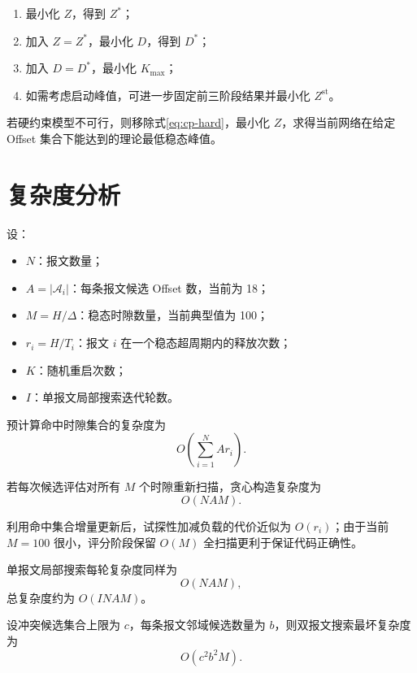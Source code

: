 \documentclass[UTF8,12pt,a4paper]{ctexart}
\newcommand{\Oset}{\mathcal{A}}
\begin{document}
\begin{enumerate}
  \item 最小化 $Z$，得到 $Z^*$；
  \item 加入 $Z=Z^*$，最小化 $D$，得到 $D^*$；
  \item 加入 $D=D^*$，最小化 $K_{\max}$；
  \item 如需考虑启动峰值，可进一步固定前三阶段结果并最小化 $Z^{\mathrm{st}}$。
\end{enumerate}

若硬约束模型不可行，则移除式\eqref{eq:cp-hard}，最小化 $Z$，求得当前网络在给定 Offset 集合下能达到的理论最低稳态峰值。

\section{复杂度分析}

设：

\begin{itemize}
  \item $N$：报文数量；
  \item $A=|\Oset_i|$：每条报文候选 Offset 数，当前为 18；
  \item $M=H/\Delta$：稳态时隙数量，当前典型值为 100；
  \item $r_i=H/T_i$：报文 $i$ 在一个稳态超周期内的释放次数；
  \item $K$：随机重启次数；
  \item $I$：单报文局部搜索迭代轮数。
\end{itemize}

预计算命中时隙集合的复杂度为
\begin{equation}
 O\left(\sum_{i=1}^{N}A r_i\right).
\end{equation}

若每次候选评估对所有 $M$ 个时隙重新扫描，贪心构造复杂度为
\begin{equation}
 O(NAM).
\end{equation}

利用命中集合增量更新后，试探性加减负载的代价近似为 $O(r_i)$；由于当前 $M=100$ 很小，评分阶段保留 $O(M)$ 全扫描更利于保证代码正确性。

单报文局部搜索每轮复杂度同样为
\begin{equation}
 O(NAM),
\end{equation}
总复杂度约为 $O(INAM)$。

设冲突候选集合上限为 $c$，每条报文邻域候选数量为 $b$，则双报文搜索最坏复杂度为
\begin{equation}
 O(c^2b^2M).
\end{equation}
\end{document}
